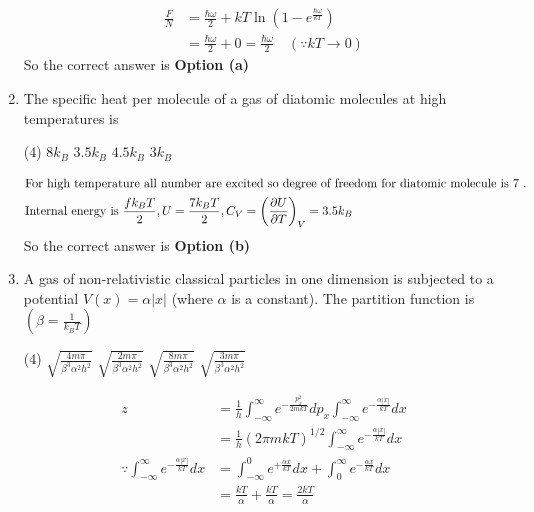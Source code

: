 \begin{enumerate}
\begin{answer}
\begin{align*}
	\frac{F}{N}&=\frac{\hbar \omega}{2}+k T \ln \left(1-e^{\frac{\hbar \omega}{k T}}\right)\\&=\frac{\hbar \omega}{2}+0=\frac{\hbar \omega}{2}\quad (\because k T \rightarrow 0)
	\end{align*}
	So the correct answer is \textbf{Option (a)}
\end{answer}
	\item The specific heat per molecule of a gas of diatomic molecules at high temperatures is
	{}
	\begin{tasks}(4)
		\task[\textbf{a.}] $8 k_{B}$
		\task[\textbf{b.}] $3.5 k_{B}$
		\task[\textbf{c.}] $4.5 k_{B}$
		\task[\textbf{d.}] $3 k_{B}$
	\end{tasks}
\begin{answer}
	\begin{align*}
	\intertext{For high temperature all number are excited so degree of freedom for diatomic molecule is 7 .}
	\text{Internal energy is }\frac{f k_{B} T}{2}, U&=\frac{7 k_{B} T}{2}, C_{V}=\left(\frac{\partial U}{\partial T}\right)_{V}=3.5 k_{B}
	\end{align*}
	So the correct answer is \textbf{Option (b)}
\end{answer}
	\item A gas of non-relativistic classical particles in one dimension is subjected to a potential $V(x)=\alpha|x|$ (where $\alpha$ is a constant). The partition function is $\left(\beta=\frac{1}{k_{B} T}\right)$
	{}
	\begin{tasks}(4)
		\task[\textbf{a.}] $\sqrt{\frac{4 m \pi}{\beta^{3} \alpha^{2} h^{2}}}$
		\task[\textbf{b.}] $\sqrt{\frac{2 m \pi}{\beta^{3} \alpha^{2} h^{2}}}$
		\task[\textbf{c.}] $\sqrt{\frac{8 m \pi}{\beta^{3} \alpha^{2} h^{2}}}$
		\task[\textbf{d.}] $\sqrt{\frac{3 m \pi}{\beta^{3} \alpha^{2} h^{2}}}$
	\end{tasks}
\begin{answer}
	\begin{align*}
	z&=\frac{1}{h} \int_{-\infty}^{\infty} e^{-\frac{p_{x}^{2}}{2 m k T}} d p_{x} \int_{-\infty}^{\infty} e^{-\frac{\alpha|x|}{k T}} d x\\&=\frac{1}{h}(2 \pi m k T)^{1 / 2} \int_{-\infty}^{\infty} e^{-\frac{\alpha|x|}{k T}} d x\\
	\because \int_{-\infty}^{\infty} e^{-\frac{\alpha|x|}{k T}} d x&=\int_{-\infty}^{0} e^{+\frac{\alpha x}{k T}} d x+\int_{0}^{\infty} e^{-\frac{\alpha x}{k T}} d x\\&=\frac{k T}{\alpha}+\frac{k T}{\alpha}=\frac{2 k T}{\alpha}\\

\end{align*}
\end{answer}
\end{enumerate}
